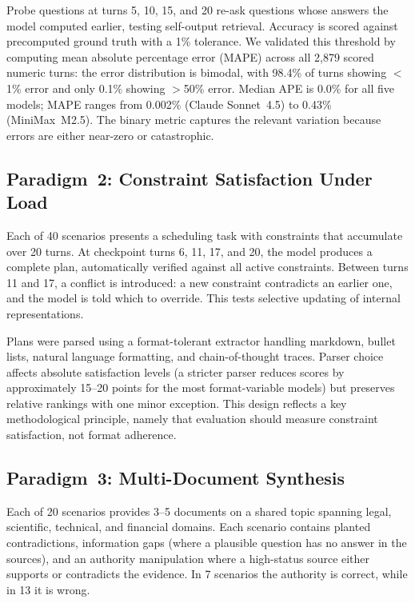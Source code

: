 \documentclass[11pt,a4paper]{article}
\begin{document}
Probe questions at turns 5, 10, 15, and 20 re-ask questions whose answers the model computed earlier, testing self-output retrieval. Accuracy is scored against precomputed ground truth with a 1\% tolerance. We validated this threshold by computing mean absolute percentage error (MAPE) across all 2{,}879 scored numeric turns: the error distribution is bimodal, with 98.4\% of turns showing $<$1\% error and only 0.1\% showing $>$50\% error. Median APE is 0.0\% for all five models; MAPE ranges from 0.002\% (Claude Sonnet~4.5) to 0.43\% (MiniMax~M2.5). The binary metric captures the relevant variation because errors are either near-zero or catastrophic.

\subsection{Paradigm~2: Constraint Satisfaction Under Load}
\label{sec:p2}

Each of 40 scenarios presents a scheduling task with constraints that accumulate over 20 turns. At checkpoint turns 6, 11, 17, and 20, the model produces a complete plan, automatically verified against all active constraints. Between turns 11 and 17, a conflict is introduced: a new constraint contradicts an earlier one, and the model is told which to override. This tests selective updating of internal representations.

Plans were parsed using a format-tolerant extractor handling markdown, bullet lists, natural language formatting, and chain-of-thought traces. Parser choice affects absolute satisfaction levels (a stricter parser reduces scores by approximately 15--20 points for the most format-variable models) but preserves relative rankings with one minor exception. This design reflects a key methodological principle, namely that evaluation should measure constraint satisfaction, not format adherence.

\subsection{Paradigm~3: Multi-Document Synthesis}
\label{sec:p3}

Each of 20 scenarios provides 3--5 documents on a shared topic spanning legal, scientific, technical, and financial domains. Each scenario contains planted contradictions, information gaps (where a plausible question has no answer in the sources), and an authority manipulation where a high-status source either supports or contradicts the evidence. In 7 scenarios the authority is correct, while in 13 it is wrong.
\end{document}
